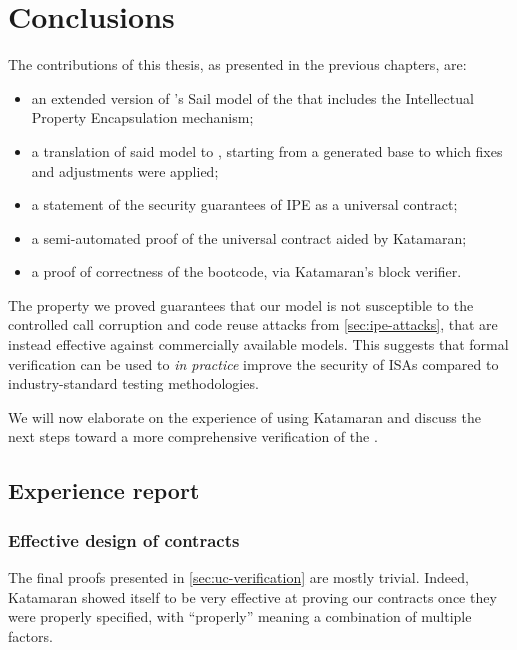 \chapter{Conclusions}

The contributions of this thesis, as presented in the previous chapters, are:
\begin{itemize}
\item an extended version of \cite{mspthesis}'s Sail model of the \msp that includes the Intellectual Property Encapsulation mechanism;
\item a translation of said model to \usail, starting from a generated base to which fixes and adjustments were applied;
\item a statement of the security guarantees of IPE as a universal contract;
\item a semi-automated proof of the universal contract aided by Katamaran;
\item a proof of correctness of the \msp bootcode, via Katamaran's block verifier.
\end{itemize}

The property we proved guarantees that our model is not susceptible to the controlled call corruption and code reuse attacks from \cref{sec:ipe-attacks}, that are instead effective against commercially available \msp models. This suggests that formal verification can be used to \emph{in practice} improve the security of ISAs compared to industry-standard testing methodologies. %

We will now elaborate on the experience of using Katamaran and discuss the next steps toward a more comprehensive verification of the \msp.

\section{Experience report}

\subsection{Effective design of contracts}

The final proofs presented in \cref{sec:uc-verification} are mostly trivial. Indeed, Katamaran showed itself to be very effective at proving our contracts once they were properly specified, with ``properly'' meaning a combination of multiple factors.

